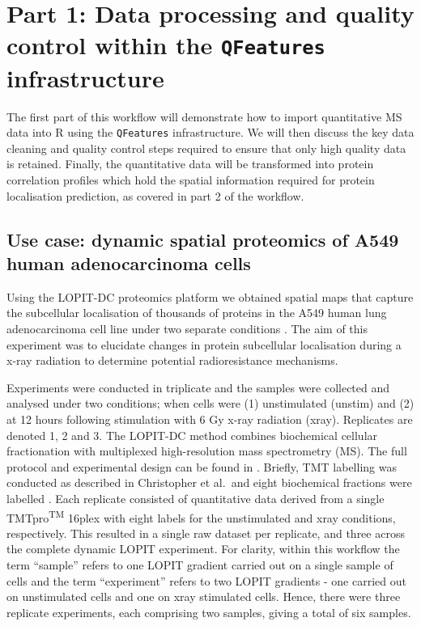 \documentclass[9pt,a4paper,]{extarticle}
\begin{document}
\section{\texorpdfstring{Part 1: Data processing and quality control within the \texttt{QFeatures} infrastructure}{Part 1: Data processing and quality control within the QFeatures infrastructure}}\label{part-1-data-processing-and-quality-control-within-the-qfeatures-infrastructure}

The first part of this workflow will demonstrate how to import quantitative MS
data into R using the \texttt{QFeatures} infrastructure. We will then discuss the key
data cleaning and quality control steps required to ensure that only high quality
data is retained. Finally, the quantitative data will be transformed into protein
correlation profiles which hold the spatial information required for
protein localisation prediction, as covered in part 2 of the workflow.

\subsection{Use case: dynamic spatial proteomics of A549 human adenocarcinoma cells}\label{use-case-dynamic-spatial-proteomics-of-a549-human-adenocarcinoma-cells}

Using the LOPIT-DC proteomics platform \citep{Geladaki2019} we obtained spatial maps
that capture the subcellular localisation of thousands of proteins in the A549 human
lung adenocarcinoma cell line under two separate conditions \citep{Christopher2025}.
The aim of this experiment was to elucidate changes in protein subcellular
localisation during a x-ray radiation to determine potential radioresistance mechanisms.

Experiments were conducted in triplicate and the samples were collected and analysed
under two conditions; when cells were (1) unstimulated (unstim) and (2) at 12 hours
following stimulation with 6 Gy x-ray radiation (xray). Replicates are denoted 1,
2 and 3. The LOPIT-DC method \citep{Geladaki2019} combines biochemical cellular fractionation with
multiplexed high-resolution mass spectrometry (MS). The full protocol and
experimental design can be found in \citep{Christopher2025}. Briefly, TMT labelling was
conducted as described in Christopher et al.~and eight biochemical fractions were
labelled \citep{Christopher2025}. Each replicate consisted of quantitative data derived
from a single TMTpro\textsuperscript{TM} 16plex with eight labels for the unstimulated and xray conditions,
respectively. This resulted in a single raw dataset per replicate, and three across
the complete dynamic LOPIT experiment. For clarity, within this workflow the
term ``sample'' refers to one LOPIT gradient carried out on a single sample of
cells and the term ``experiment'' refers to two LOPIT gradients - one carried out
on unstimulated cells and one on xray stimulated cells. Hence, there were three
replicate experiments, each comprising two samples, giving a total of six samples.
\end{document}
